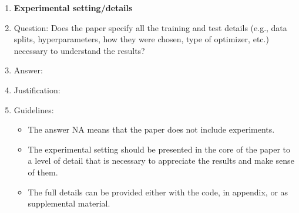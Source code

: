 \documentclass{article}
\begin{document}
\begin{enumerate}
\item {\bf Experimental setting/details}
    \item[] Question: Does the paper specify all the training and test details (e.g., data splits, hyperparameters, how they were chosen, type of optimizer, etc.) necessary to understand the results?
    \item[] Answer: \answerTODO{} %
    \item[] Justification: \justificationTODO{}
    \item[] Guidelines:
    \begin{itemize}
        \item The answer NA means that the paper does not include experiments.
        \item The experimental setting should be presented in the core of the paper to a level of detail that is necessary to appreciate the results and make sense of them.
        \item The full details can be provided either with the code, in appendix, or as supplemental material.
    \end{itemize}


\end{enumerate}
\end{document}

